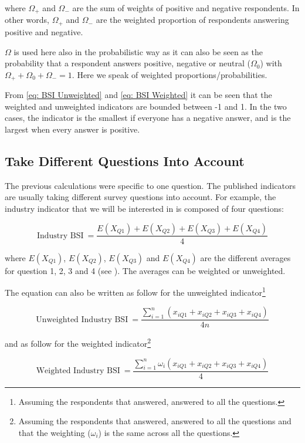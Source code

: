 \documentclass[12pt,a4paper,oneside]{book}
\begin{document}
where $\Omega_+$ and $\Omega_-$ are the sum of weights of positive and negative respondents. 
In other words, $\Omega_+$ and $\Omega_-$ are the weighted proportion of respondents answering positive and negative. 

$\Omega$ is used here also in the probabilistic way as it can also be seen as the probability that a respondent answers positive, negative or neutral ($\Omega_0$) with $\Omega_+ + \Omega_0 + \Omega_- =1$. Here we speak of weighted proportions/probabilities.

From \autoref{eq: BSI Unweighted} and \autoref{eq: BSI Weighted} it can be seen that the weighted and unweighted indicators are bounded between -1 and 1. In the two cases, the indicator is the smallest if everyone has a negative answer, and is the largest when every answer is positive.

\subsection{Take Different Questions Into Account}

The previous calculations were specific to one question. The published indicators are usually taking different survey questions into account. For example, the industry indicator that we will be interested in is composed of four questions:

\begin{equation}
    \mbox{Industry BSI}\ = \frac{E(X_{Q1}) + E(X_{Q2}) + E(X_{Q3}) + E(X_{Q4})}{4}
\end{equation}

where 
$E(X_{Q1})$, $E(X_{Q2})$, $E(X_{Q3})$ and $E(X_{Q4})$ are the different averages for question 1, 2, 3 and 4 (see ). The averages can be weighted or unweighted.

The equation can also be written as follow for the unweighted indicator\footnote{Assuming the respondents that answered, answered to all the questions.}

\begin{equation}
    \mbox{Unweighted Industry BSI}\ = \frac{\sum^n_{i=1}(x_{iQ1} + x_{iQ2} + x_{iQ3} + x_{iQ4})}{4n} 
\end{equation} 

and as follow for the weighted indicator\footnote{Assuming the respondents that answered, answered to all the questions and that the weighting ($\omega_i$) is the same across all the questions.}

\begin{equation}
    \mbox{Weighted Industry BSI}\ = \frac{\sum^n_{i=1} \omega_i (x_{iQ1} + x_{iQ2} + x_{iQ3} + x_{iQ4})}{4} 
\end{equation} 
\end{document}
